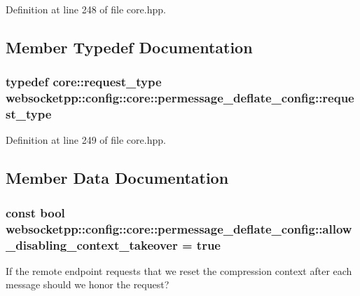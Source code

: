 Definition at line 248 of file core.\+hpp.



\subsection{Member Typedef Documentation}
\hypertarget{structwebsocketpp_1_1config_1_1core_1_1permessage__deflate__config_aba198d4d1a05699588fb13335b57b38c}{}
\subsubsection[{request\+\_\+type}]{\setlength{\rightskip}{0pt plus 5cm}typedef {\bf core\+::request\+\_\+type} {\bf websocketpp\+::config\+::core\+::permessage\+\_\+deflate\+\_\+config\+::request\+\_\+type}}\label{structwebsocketpp_1_1config_1_1core_1_1permessage__deflate__config_aba198d4d1a05699588fb13335b57b38c}


Definition at line 249 of file core.\+hpp.



\subsection{Member Data Documentation}
\hypertarget{structwebsocketpp_1_1config_1_1core_1_1permessage__deflate__config_ac9b85348637f891c2965e15532a7018e}{}
\subsubsection[{allow\+\_\+disabling\+\_\+context\+\_\+takeover}]{\setlength{\rightskip}{0pt plus 5cm}const bool websocketpp\+::config\+::core\+::permessage\+\_\+deflate\+\_\+config\+::allow\+\_\+disabling\+\_\+context\+\_\+takeover = true\hspace{0.3cm}{\ttfamily [static]}}\label{structwebsocketpp_1_1config_1_1core_1_1permessage__deflate__config_ac9b85348637f891c2965e15532a7018e}
If the remote endpoint requests that we reset the compression context after each message should we honor the request? 

